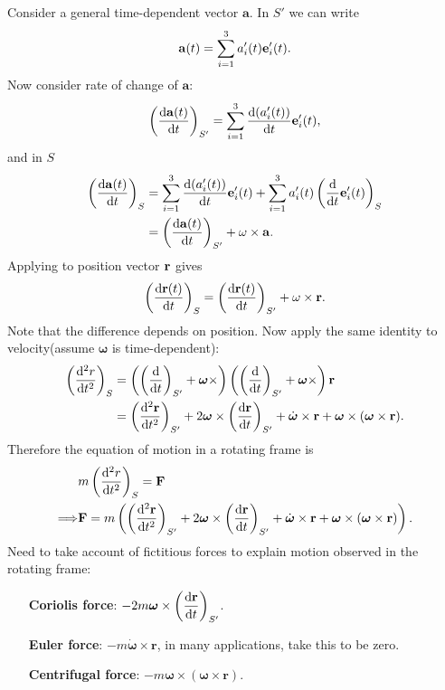 Consider a general time-dependent vector $ \mathbf{a} $. In $ S' $ we can write
\[
    \mathbf{a}(t) = \sum_{i=1}^{3} a_i'(t){\bf e}_i'(t).
\]
Now consider rate of change of $ \mathbf{a} $:
\[
    \left( \frac{\mathrm{d}{\bf a}(t)}{\mathrm{d}t}  \right)_{S'} = \sum_{i=1}^{3}\frac{\mathrm{d}(a_i'(t))}{\mathrm{d}t}{\bf e}_i'(t) ,
\] 
and in $S$ 
\begin{align*}
    \left( \frac{\mathrm{d}{\bf a}(t)}{\mathrm{d}t} \right)_S 
    &= \sum_{i=1}^{3}\frac{\mathrm{d}(a_i'(t))}{\mathrm{d}t}{\bf e}_i'(t) + \sum_{i=1}^{3} a_i'(t) \left( \frac{\mathrm{d}}{\mathrm{d}t}{\bf e}_i'(t) \right)_S \\ 
    &= \left( \frac{\mathrm{d}{\bf a}(t)}{\mathrm{d}t}  \right)_{S'}+\omega \times {\bf a}.
\end{align*}
Applying to position vector ${\bf r}$  gives
\[
    \left( \frac{\mathrm{d}{\bf r}(t)}{\mathrm{d}t} \right)_S=\left( \frac{\mathrm{d}{\bf r}(t)}{\mathrm{d}t}  \right)_{S'}+\omega \times {\bf r}.
\]
Note that the difference depends on position. Now apply the same identity to velocity(assume $ \boldsymbol{\omega} $ is time-dependent):
\begin{align*}
    \left( \frac{\mathrm{d}^2r}{\mathrm{d}t^2}  \right)_S &= \left( \left( \frac{\mathrm{d}}{\mathrm{d}t}  \right)_{S'}+\boldsymbol{\omega}\times  \right)\left( \left( \frac{\mathrm{d}}{\mathrm{d}t}  \right)_{S'}+\boldsymbol{\omega}\times  \right){\bf r}\\ 
    &=\left( \frac{\mathrm{d}^2{\bf r}}{\mathrm{d}t^2}  \right)_{S'}+2 \boldsymbol{\omega}\times \left( \frac{\mathrm{d}{\bf r}}{\mathrm{d}t}  \right)_{S'}+\dot{\boldsymbol{\omega}}\times \mathbf{r}+\boldsymbol{\omega} \times (\boldsymbol{\omega} \times \mathbf{r}).
\end{align*}
Therefore the equation of motion in a rotating frame is 
\begin{align*}
    &m \left( \frac{\mathrm{d}^2r}{\mathrm{d}t^2}  \right)_S ={\bf F}\\ 
    \Longrightarrow &{\bf F}= m\left( \left( \frac{\mathrm{d}^2{\bf r}}{\mathrm{d}t^2}  \right)_{S'}+2 \boldsymbol{\omega}\times \left( \frac{\mathrm{d}{\bf r}}{\mathrm{d}t}  \right)_{S'}+\dot{\boldsymbol{\omega}}\times \mathbf{r}+\boldsymbol{\omega} \times (\boldsymbol{\omega} \times \mathbf{r}) \right).
\end{align*}
Need to take account of fictitious forces to explain motion observed in the rotating frame:
\begin{enumerate}[align=left]
    \item[\textbf{Coriolis force}:] $\displaystyle -2m\boldsymbol{\omega}\times \left( \frac{\mathrm{d}{\bf r}}{\mathrm{d}t}  \right)_{S'}$.
    \item[\textbf{Euler force}:] $\displaystyle -m\dot{\boldsymbol{\omega}}\times \mathbf{r}$, in many applications, take this to be zero.
    \item[\textbf{Centrifugal force}:] $\displaystyle -m\boldsymbol{\omega} \times (\boldsymbol{\omega} \times \mathbf{r})$.
\end{enumerate}

